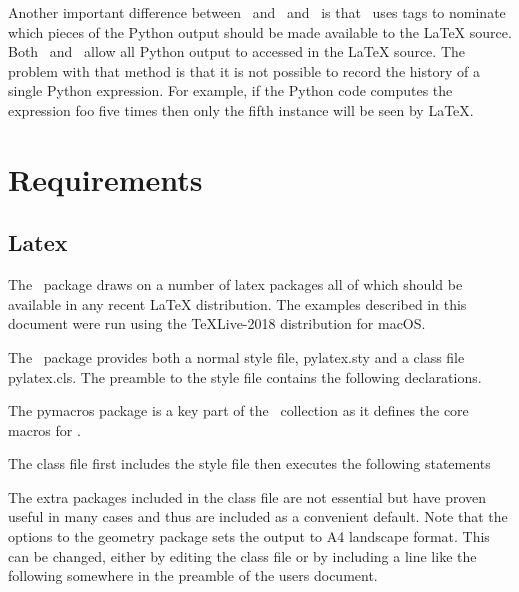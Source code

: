 \documentclass[12pt]{article}
\begin{document}
Another important difference between \pyLaTeX\ and \PythonTeX\ and \SageTeX\ is
that \pyLaTeX\ uses tags to nominate which pieces of the Python output should be
made available to the LaTeX source. Both \PythonTeX\ and \SageTeX\ allow all Python
output to accessed in the LaTeX source. The problem with that method is that it is
not possible to record the history of a single Python expression. For example, if
the Python code computes the expression {\tts foo} five times then only the fifth
instance will be seen by LaTeX.

\section{Requirements}

\subsection{Latex}
The \pyLaTeX\ package draws on a number of latex packages all of which should be
available in any recent LaTeX distribution. The examples described in this document
were run using the {\tts TeXLive-2018} distribution for macOS.

The \pyLaTeX\ package provides both a normal style file, {\tts pylatex.sty} and a
class file {\tts pylatex.cls}. The preamble to the style file contains the
following declarations.

\vskip 12pt

\begin{latex}
   \usepackage{comment}
   \usepackage{listings}
   \usepackage{keyval}
   \usepackage{etoolbox}
   \usepackage{xcolor}
   \usepackage{pymacros}
\end{latex}

The {\tts pymacros} package is a key part of the \pyLaTeX\ collection as it defines
the core macros for \pyLaTeX.

The class file first includes the style file then executes the following statements

\vskip 12pt

\begin{latex}
   \usepackage[papersize={297mm,210mm},
               hmargin=2cm,tmargin=1.0cm,bmargin=1.5cm]{geometry}
   \usepackage{amsmath}
   \usepackage{amssymb}
   \usepackage{hyperref}
   \usepackage{breqn}
\end{latex}

The extra packages included in the class file are not essential but have proven
useful in many cases and thus are included as a convenient default. Note that the
options to the geometry package sets the output to A4 landscape format. This can be
changed, either by editing the class file or by including a line like the following
somewhere in the preamble of the users document.
\end{document}
